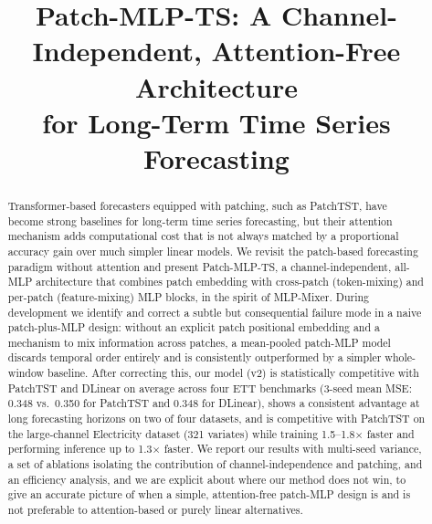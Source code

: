 \documentclass[conference]{IEEEtran}
\begin{document}
\title{Patch-MLP-TS: A Channel-Independent, Attention-Free Architecture\\
for Long-Term Time Series Forecasting}

\author{
}

\maketitle

\begin{abstract}
Transformer-based forecasters equipped with patching, such as PatchTST, have become
strong baselines for long-term time series forecasting, but their attention mechanism
adds computational cost that is not always matched by a proportional accuracy gain
over much simpler linear models. We revisit the patch-based forecasting paradigm
without attention and present Patch-MLP-TS, a channel-independent, all-MLP architecture
that combines patch embedding with cross-patch (token-mixing) and per-patch
(feature-mixing) MLP blocks, in the spirit of MLP-Mixer. During development we identify
and correct a subtle but consequential failure mode in a naive patch-plus-MLP design:
without an explicit patch positional embedding and a mechanism to mix information
across patches, a mean-pooled patch-MLP model discards temporal order entirely and
is consistently outperformed by a simpler whole-window baseline. After correcting
this, our model (v2) is statistically competitive with PatchTST and DLinear on
average across four ETT benchmarks (3-seed mean MSE: 0.348 vs.\ 0.350 for PatchTST
and 0.348 for DLinear), shows a consistent advantage at long forecasting horizons on
two of four datasets, and is competitive with PatchTST on the large-channel
Electricity dataset (321 variates) while training 1.5--1.8$\times$ faster and
performing inference up to 1.3$\times$ faster. We report our results with multi-seed
variance, a set of ablations isolating the contribution of channel-independence and
patching, and an efficiency analysis, and we are explicit about where our method does
not win, to give an accurate picture of when a simple, attention-free patch-MLP design
is and is not preferable to attention-based or purely linear alternatives.
\end{abstract}
\end{document}
